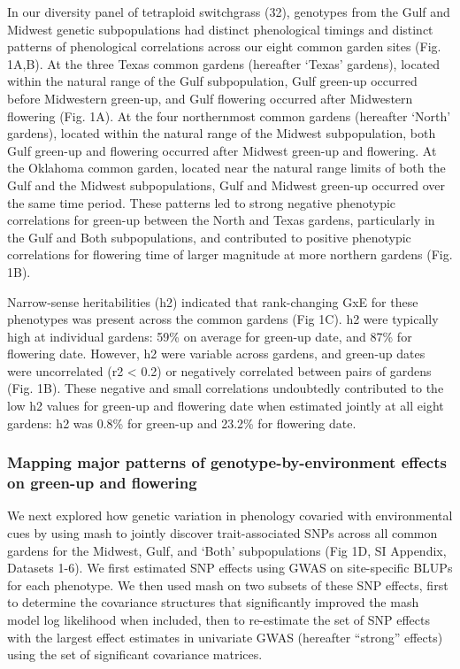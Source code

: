 \documentclass[
  9pt,
  twocolumn,
  twoside]{pnas-new}
\begin{document}
In our diversity panel of tetraploid switchgrass (32), genotypes from
the Gulf and Midwest genetic subpopulations had distinct phenological
timings and distinct patterns of phenological correlations across our
eight common garden sites (Fig. 1A,B). At the three Texas common gardens
(hereafter `Texas' gardens), located within the natural range of the
Gulf subpopulation, Gulf green-up occurred before Midwestern green-up,
and Gulf flowering occurred after Midwestern flowering (Fig. 1A). At the
four northernmost common gardens (hereafter `North' gardens), located
within the natural range of the Midwest subpopulation, both Gulf
green-up and flowering occurred after Midwest green-up and flowering. At
the Oklahoma common garden, located near the natural range limits of
both the Gulf and the Midwest subpopulations, Gulf and Midwest green-up
occurred over the same time period. These patterns led to strong
negative phenotypic correlations for green-up between the North and
Texas gardens, particularly in the Gulf and Both subpopulations, and
contributed to positive phenotypic correlations for flowering time of
larger magnitude at more northern gardens (Fig. 1B).

Narrow-sense heritabilities (h2) indicated that rank-changing GxE for
these phenotypes was present across the common gardens (Fig 1C). h2 were
typically high at individual gardens: 59\% on average for green-up date,
and 87\% for flowering date. However, h2 were variable across gardens,
and green-up dates were uncorrelated (r2 \textless{} 0.2) or negatively
correlated between pairs of gardens (Fig. 1B). These negative and small
correlations undoubtedly contributed to the low h2 values for green-up
and flowering date when estimated jointly at all eight gardens: h2 was
0.8\% for green-up and 23.2\% for flowering date.

\subsubsection{Mapping major patterns of genotype-by-environment effects
on green-up and
flowering}\label{mapping-major-patterns-of-genotype-by-environment-effects-on-green-up-and-flowering}

We next explored how genetic variation in phenology covaried with
environmental cues by using mash to jointly discover trait-associated
SNPs across all common gardens for the Midwest, Gulf, and `Both'
subpopulations (Fig 1D, SI Appendix, Datasets 1-6). We first estimated
SNP effects using GWAS on site-specific BLUPs for each phenotype. We
then used mash on two subsets of these SNP effects, first to determine
the covariance structures that significantly improved the mash model log
likelihood when included, then to re-estimate the set of SNP effects
with the largest effect estimates in univariate GWAS (hereafter
``strong'' effects) using the set of significant covariance matrices.
\end{document}
